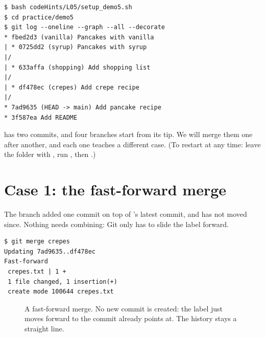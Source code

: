\begin{lstlisting}
$ bash codeHints/L05/setup_demo5.sh
$ cd practice/demo5
$ git log --oneline --graph --all --decorate
* fbed2d3 (vanilla) Pancakes with vanilla
| * 0725dd2 (syrup) Pancakes with syrup
|/
| * 633affa (shopping) Add shopping list
|/
| * df478ec (crepes) Add crepe recipe
|/
* 7ad9635 (HEAD -> main) Add pancake recipe
* 3f587ea Add README
\end{lstlisting}

 has two commits, and four branches start from its tip. We will merge them one after another, and each one teaches a different case. (To restart at any time: leave the folder with , run , then .)

\section{Case 1: the fast-forward merge}

The branch  added one commit on top of 's latest commit, and  has not moved since. Nothing needs combining: Git only has to slide the  label forward.

\begin{lstlisting}
$ git merge crepes
Updating 7ad9635..df478ec
Fast-forward
 crepes.txt | 1 +
 1 file changed, 1 insertion(+)
 create mode 100644 crepes.txt
\end{lstlisting}

\begin{figure}[H]
\centering
{}
\caption{A fast-forward merge. No new commit is created: the  label just moves forward to the commit  already points at. The history stays a straight line.}
\label{fig:ff}
\end{figure}

